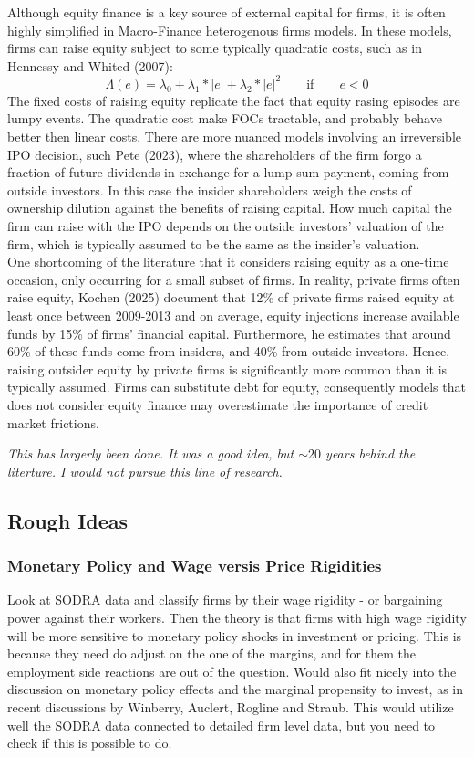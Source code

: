 \documentclass[12pt]{article}
\begin{document}
Although equity finance is a key source of external capital for firms, it is often highly simplified in Macro-Finance heterogenous firms models. In these models, firms can raise equity subject to some typically quadratic costs, such as in Hennessy and Whited (2007): 
$$ \Lambda(e) = \lambda_0 + \lambda_1*|e| + \lambda_2*|e|^2 \qquad \text{if} \qquad e < 0  $$
The fixed costs of raising equity replicate the fact that equity rasing episodes are lumpy events. The quadratic cost make FOCs tractable, and probably behave better then linear costs. There are more nuanced models involving an irreversible IPO decision, such Pete (2023), where the shareholders of the firm forgo a fraction of future dividends in exchange for a lump-sum payment, coming from outside investors. In this case the insider shareholders weigh the costs of ownership dilution against the benefits of raising capital. How much capital the firm can raise with the IPO depends on the outside investors' valuation of the firm, which is typically assumed to be the same as the insider's valuation. \vspace{3mm} \\
One shortcoming of the literature that it considers raising equity as a one-time occasion, only occurring for a small subset of firms. In reality, private firms often raise equity, Kochen (2025) document that 12\% of private firms raised equity at least once between 2009-2013 and on average, equity injections increase available funds by 15\% of firms’ financial capital. Furthermore, he estimates that around 60\% of these funds come from insiders, and 40\% from outside investors. Hence, raising outsider equity by private firms is significantly more common than it is typically assumed. Firms can substitute debt for equity, consequently models that does not consider equity finance may overestimate the importance of credit market frictions. \vspace{3mm} 

\noindent \textit{This has largerly been done. It was a good idea, but $\sim20$ years behind the literture. I would not pursue this line of research.}

\subsection*{Rough Ideas}

\subsubsection*{Monetary Policy and Wage versis Price Rigidities}
Look at SODRA data and classify firms by their wage rigidity - or bargaining power against their workers. Then the theory is that firms with high wage rigidity will be more sensitive to monetary policy shocks in investment or pricing. This is because they need do adjust on the one of the margins, and for them the employment side reactions are out of the question. Would also fit nicely into the discussion on monetary policy effects and the marginal propensity to invest, as in recent discussions by Winberry, Auclert, Rogline and Straub. This would utilize well the SODRA data connected to detailed firm level data, but you need to check if this is possible to do. 
\end{document}
